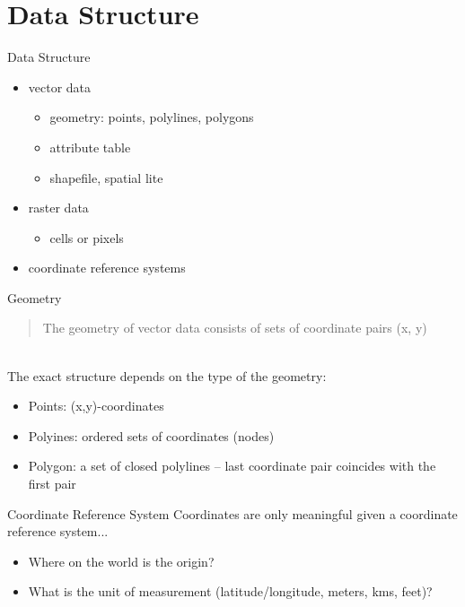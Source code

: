 \section{Data Structure}
\begin{frame}{Data Structure}
	\hspace{2pt}
\begin{itemize}
	\item vector data
	\begin{itemize}
		\item geometry: points, polylines, polygons
		\item attribute table
		\item shapefile, spatial lite
	\end{itemize}
	\item raster data
	\begin{itemize}
		\item cells or pixels
	\end{itemize}
	\item coordinate reference systems
\end{itemize}
\end{frame}

\begin{frame}{Geometry}
	\hspace{4pt}
	\begin{quote}
		The geometry of vector data consists of sets of coordinate pairs (x, y)
	\end{quote} 
	\hspace{4pt} \\
	The exact structure depends on the type of the geometry:
	\begin{itemize}
		\item Points: (x,y)-coordinates
		\item Polyines: ordered sets of coordinates (nodes)
		\item Polygon: a set of closed polylines -- last coordinate pair coincides with the first pair
	\end{itemize}
\end{frame}

\begin{frame}{Coordinate Reference System}
	Coordinates are only meaningful given a coordinate reference system...
	\begin{itemize}
		\item Where on the world is the origin?
		\item What is the unit of measurement (latitude/longitude, meters, kms, feet)?
	\end{itemize}
\end{frame}

